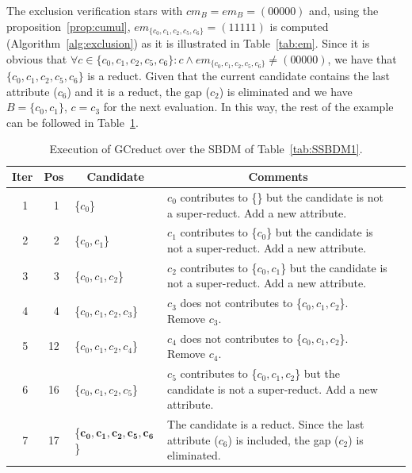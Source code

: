\documentclass[number,preprint,review,12pt]{elsarticle}
\begin{document}
  The exclusion verification stars with $cm_B = em_B = (00000)$ and, using the proposition~\ref{prop:cumul}, $em_{\lbrace c_0,c_1,c_2,c_5,c_6\rbrace}=(11111)$ is computed (Algorithm~\ref{alg:exclusion}) as it is illustrated in Table~\ref{tab:em}. Since it is obvious that $\forall c \in \lbrace c_0,c_1,c_2,c_5,c_6\rbrace : c\wedge em_{\lbrace c_0,c_1,c_2,c_5,c_6\rbrace} \neq (00000)$, we have that $\lbrace c_0,c_1,c_2,c_5,c_6\rbrace$ is a reduct. Given that the current candidate contains the last attribute ($c_6$) and it is a reduct, the gap ($c_2$) is eliminated and we have $B = \lbrace c_0,c_1\rbrace$, $c=c_3$ for the next evaluation. In this way, the rest of the example can be followed in Table~\ref{tab:sample_GCreduct}.

  \begin{table}[!htb]
	\caption{Execution of GCreduct over the SBDM of Table~\ref{tab:SSBDM1}.}\label{tab:sample_GCreduct}
	\centering \scriptsize
	\begin{tabular}{|c|c|l|l|l|}
		\hline
		Iter & Pos & \multicolumn{1}{c|}{Candidate} & \multicolumn{1}{c|}{Comments}\\
		\hline
		~1 & ~1 & \{$c_0$\} 			    & \multicolumn{1}{p{8.5cm}|}{$c_0$ contributes to \{\} but the candidate is not a super-reduct. Add a new attribute.}\\
				\hline
		~2 & ~2 & \{$c_0,c_1$\}				& \multicolumn{1}{p{8.5cm}|}{$c_1$ contributes to \{$c_0$\} but the candidate is not a super-reduct. Add a new attribute.}\\
				\hline
		~3 & ~3 & \{$c_0,c_1,c_2$\}			& \multicolumn{1}{p{8.5cm}|}{$c_2$ contributes to \{$c_0,c_1$\} but the candidate is not a super-reduct. Add a new attribute.}\\
				\hline				
		~4 & ~4 & \{$c_0,c_1,c_2,c_3$\}		& \multicolumn{1}{p{8.5cm}|}{$c_3$ does not contributes to \{$c_0,c_1,c_2$\}. Remove $c_3$.}\\
				\hline
		~5 & 12 & \{$c_0,c_1,c_2,c_4$\}		& \multicolumn{1}{p{8.5cm}|}{$c_4$ does not contributes to \{$c_0,c_1,c_2$\}. Remove $c_4$.}\\
				\hline
		~6 & 16 & \{$c_0,c_1,c_2,c_5$\}		& \multicolumn{1}{p{8.5cm}|}{$c_5$ contributes to \{$c_0,c_1,c_2$\} but the candidate is not a super-reduct. Add a new attribute.}\\
				\hline
		~7 & 17 & \{$\mathbf{c_0,c_1,c_2,c_5,c_6}$\} & \multicolumn{1}{p{8.5cm}|}{The candidate is a reduct. Since the last attribute ($c_6$) is included, the gap ($c_2$) is eliminated.}\\
				\hline

\end{tabular}
\end{table}
\end{document}

